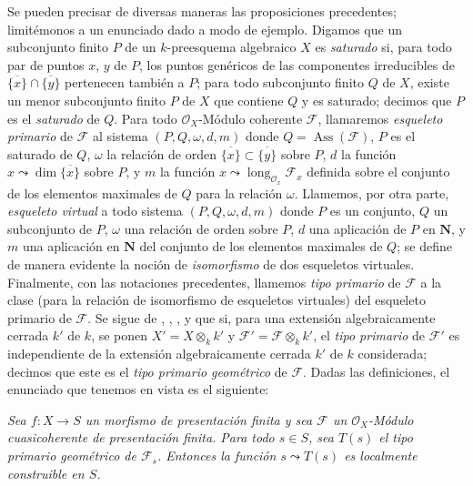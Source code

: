 \begin{remark}[9.8.9]
\label{IV.9.8.9}
Se pueden precisar de diversas maneras las proposiciones precedentes; limitémonos a un enunciado dado a modo de ejemplo.
Digamos que un subconjunto finito $P$ de un $k$-preesquema algebraico $X$ es \emph{saturado} si, para todo par de puntos $x$, $y$ de $P$, los puntos genéricos de las componentes irreducibles de $\overline{\{x\}}\cap\overline{\{y\}}$ pertenecen también a $P$; para todo subconjunto finito $Q$ de $X$, existe un menor subconjunto finito $P$ de $X$ que contiene $Q$ y es saturado; decimos que $P$ es el \emph{saturado} de $Q$.
Para todo $\mathcal O_X$-Módulo coherente $\mathcal F$, llamaremos \emph{esqueleto primario} de $\mathcal F$ al sistema $(P,Q,\omega,d,m)$ donde $Q=\operatorname{Ass}(\mathcal F)$, $P$ es el saturado de $Q$, $\omega$ la relación de orden $\overline{\{x\}}\subset\overline{\{y\}}$ sobre $P$, $d$ la función $x\leadsto\dim\overline{\{x\}}$ sobre $P$, y $m$ la función $x\leadsto\operatorname{long}_{\mathcal O_x}\mathcal F_x$ definida sobre el conjunto de los elementos maximales de $Q$ para la relación $\omega$.
Llamemos, por otra parte, \emph{esqueleto virtual} a todo sistema $(P,Q,\omega,d,m)$ donde $P$ es un conjunto, $Q$ un subconjunto de $P$, $\omega$ una relación de orden sobre $P$, $d$ una aplicación de $P$ en $\mathbf N$, y $m$ una aplicación en $\mathbf N$ del conjunto de los elementos maximales de $Q$; se define de manera evidente la noción de \emph{isomorfismo} de dos esqueletos virtuales.
Finalmente, con las notaciones precedentes, llamemos \emph{tipo primario} de $\mathcal F$ a la clase (para la relación de isomorfismo de esqueletos virtuales) del esqueleto primario de $\mathcal F$.
Se sigue de , , ,  y  que si, para una extensión algebraicamente cerrada $k'$ de $k$, se ponen $X'=X\otimes_k k'$ y $\mathcal F'=\mathcal F\otimes_k k'$, el \emph{tipo primario} de $\mathcal F'$ es independiente de la
extensión algebraicamente cerrada $k'$ de $k$ considerada; decimos que este es el \emph{tipo primario geométrico} de $\mathcal F$.
Dadas las definiciones, el enunciado que tenemos en vista es el siguiente:

\medskip
\noindent
\emph{}
\label{IV.9.8.9.1}
\textit{Sea $f:X\to S$ un morfismo de presentación finita y sea $\mathcal F$ un $\mathcal O_X$-Módulo cuasicoherente de presentación finita.
Para todo $s\in S$, sea $T(s)$ el tipo primario geométrico de $\mathcal F_s$.
Entonces la función $s\leadsto T(s)$ es localmente construible en $S$.}


\end{remark}
